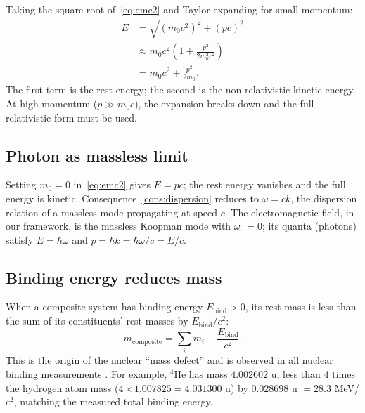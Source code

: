 Taking the square root of~\eqref{eq:emc2} and Taylor-expanding for small momentum:
\begin{align*}
E &= \sqrt{(m_{0}c^{2})^{2}+(pc)^{2}}\\
  &\approx m_{0}c^{2}\left(1+\frac{p^{2}}{2m_{0}^{2}c^{2}}\right)\\
  &= m_{0}c^{2}+\frac{p^{2}}{2m_{0}}.
\end{align*}
The first term is the rest energy; the second is the non-relativistic kinetic energy. At high momentum ($p\gg m_{0}c$), the expansion breaks down and the full relativistic form must be used.

\subsection{Photon as massless limit}

Setting $m_{0}=0$ in~\eqref{eq:emc2} gives $E=pc$; the rest energy vanishes and the full energy is kinetic. Consequence~\ref{cons:dispersion} reduces to $\omega=ck$, the dispersion relation of a massless mode propagating at speed $c$. The electromagnetic field, in our framework, is the massless Koopman mode with $\omega_{0}=0$; its quanta (photons) satisfy $E=\hbar\omega$ and $p=\hbar k=\hbar\omega/c=E/c$.

\subsection{Binding energy reduces mass}

When a composite system has binding energy $E_{\text{bind}}>0$, its rest mass is less than the sum of its constituents' rest masses by $E_{\text{bind}}/c^{2}$:
\begin{equation*}
m_{\text{composite}}=\sum_{i}m_{i}-\frac{E_{\text{bind}}}{c^{2}}.
\end{equation*}
This is the origin of the nuclear ``mass defect'' and is observed in all nuclear binding measurements \citep{audi2017}. For example, $^{4}$He has mass $4.002602$ u, less than 4 times the hydrogen atom mass ($4\times 1.007825=4.031300$ u) by $0.028698$ u $=28.3$ MeV/$c^{2}$, matching the measured total binding energy.
